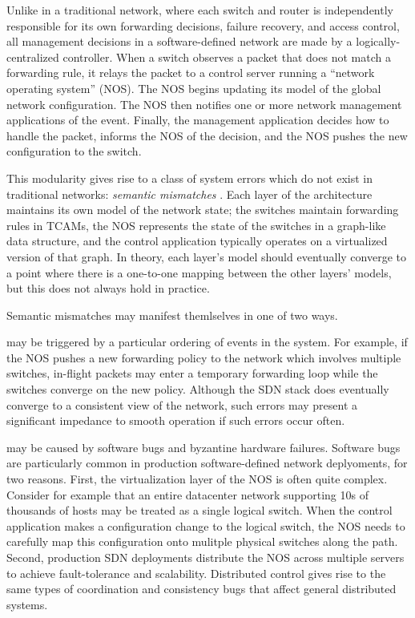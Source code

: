 

Unlike in a traditional network, where each switch and router is independently responsible for
its own forwarding decisions, failure recovery, and access control, all management
decisions in a software-defined network are made by a logically-centralized controller. When a
switch observes a packet that does not match a forwarding rule, 
it relays the packet to a control server running a ``network operating system''
(NOS). The NOS begins updating its model of the global network configuration.
The NOS then notifies one or more network management applications of the event. Finally, the management
application decides how to handle the packet, informs the NOS of the decision,
and the NOS pushes the new configuration to the switch.

This modularity gives rise to a class of system errors which do not exist in
traditional networks: {\it semantic mismatches} . Each layer of the architecture
maintains its own model of the network state; the switches maintain forwarding
rules in TCAMs, the NOS represents the state of the switches in a graph-like data
structure, and the control application typically operates on 
a virtualized version of that graph. In theory, each layer's model should eventually
converge to a point where there is a one-to-one mapping 
between the other layers' models, but this does not always hold in practice.

Semantic mismatches may manifest themlselves in one of two ways.

 may be triggered by a particular ordering of
events in the system. For example, if the NOS pushes a new forwarding policy
to the network which involves multiple switches, in-flight packets may enter a
temporary forwarding loop while the switches converge on the new policy.
 Although the SDN stack does eventually converge to
a consistent view of the network, such errors may present a significant
impedance to smooth operation if such errors occur often. 

 may be caused by software bugs and
byzantine hardware failures. Software bugs are particularly common in
production software-defined network deplyoments, for two reasons. First, the
virtualization layer of the NOS is often quite complex. Consider for example
that an entire datacenter network supporting 10s of thousands of hosts may be
treated as a single logical switch. When the control application makes a
configuration change to the logical switch, the NOS needs to carefully map this
configuration onto mulitple physical switches along the path. Second,
production SDN deployments distribute the NOS across multiple servers to achieve fault-tolerance
and scalability. Distributed control gives rise to the same types of coordination
and consistency bugs that affect general distributed systems.

